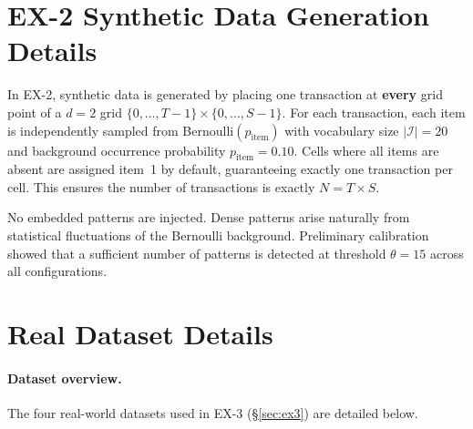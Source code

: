 \section{EX-2 Synthetic Data Generation Details}
\label{sec:ex2_data_details}

In EX-2, synthetic data is generated by placing
one transaction at \textbf{every} grid point of a $d = 2$ grid
$\{0,\ldots,T{-}1\} \times \{0,\ldots,S{-}1\}$.
For each transaction,
each item is independently sampled from
Bernoulli$(p_{\mathrm{item}})$ with
vocabulary size $|\mathcal{I}| = 20$ and
background occurrence probability $p_{\mathrm{item}} = 0.10$.
Cells where all items are absent
are assigned item~1 by default,
guaranteeing exactly one transaction per cell.
This ensures the number of transactions is exactly $N = T \times S$.

No embedded patterns are injected.
Dense patterns arise naturally from
statistical fluctuations of the Bernoulli background.
Preliminary calibration showed that
a sufficient number of patterns is detected
at threshold $\theta = 15$ across all configurations.


\section{Real Dataset Details}
\label{sec:real_data_qualitative}\label{sec:dataset_details}

\paragraph{Dataset overview.}
The four real-world datasets used in EX-3 (\S\ref{sec:ex3}) are detailed below.

